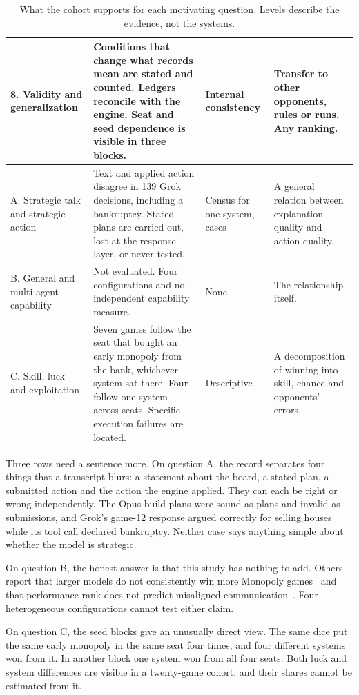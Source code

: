 \begin{table}[p]
\begin{tabularx}{\linewidth}{@{}L{2.55cm}YL{1.75cm}L{3.5cm}@{}}
8. Validity and generalization & Conditions that change what records mean are stated and counted. Ledgers reconcile with the engine. Seat and seed dependence is visible in three blocks. & Internal consistency & Transfer to other opponents, rules or runs. Any ranking.\\
\midrule
A. Strategic talk and strategic action & Text and applied action disagree in 139 Grok decisions, including a bankruptcy. Stated plans are carried out, lost at the response layer, or never tested. & Census for one system, cases & A general relation between explanation quality and action quality.\\
B. General and multi-agent capability & Not evaluated. Four configurations and no independent capability measure. & None & The relationship itself.\\
C. Skill, luck and exploitation & Seven games follow the seat that bought an early monopoly from the bank, whichever system sat there. Four follow one system across seats. Specific execution failures are located. & Descriptive & A decomposition of winning into skill, chance and opponents' errors.\\
\bottomrule
\end{tabularx}
\caption{What the cohort supports for each motivating question. Levels describe the evidence, not the systems.}
\label{tab:coverage}
\end{table}

Three rows need a sentence more. On question A, the record separates four things that a transcript blurs: a statement about the board, a stated plan, a submitted action and the action the engine applied. They can each be right or wrong independently. The Opus build plans were sound as plans and invalid as submissions, and Grok's game-12 response argued correctly for selling houses while its tool call declared bankruptcy. Neither case says anything simple about whether the model is strategic.

On question B, the honest answer is that this study has nothing to add. Others report that larger models do not consistently win more Monopoly games~\cite{wu2026agentmonopoly} and that performance rank does not predict misaligned communication~\cite{li2026arena}. Four heterogeneous configurations cannot test either claim.

On question C, the seed blocks give an unusually direct view. The same dice put the same early monopoly in the same seat four times, and four different systems won from it. In another block one system won from all four seats. Both luck and system differences are visible in a twenty-game cohort, and their shares cannot be estimated from it.
